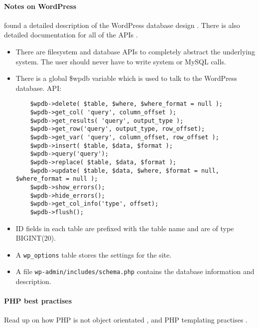 \paragraph{Notes on WordPress} found a detailed description of the
WordPress database design \cite{WordPressND}. There is also detailed
documentation for all of the APIs \cite{WordPressNDa}.
\begin{itemize}
\item There are filesystem and database APIs to completely abstract the
  underlying system. The user should never have to write system or MySQL calls.
\item There is a global \$wpdb variable which is used to talk to the WordPress
  database. API:
\begin{verbatim}
    $wpdb->delete( $table, $where, $where_format = null );
    $wpdb->get_col( 'query', column_offset );
    $wpdb->get_results( 'query', output_type );
    $wpdb->get_row('query', output_type, row_offset);
    $wpdb->get_var( 'query', column_offset, row_offset );
    $wpdb->insert( $table, $data, $format );
    $wpdb->query('query');
    $wpdb->replace( $table, $data, $format );
    $wpdb->update( $table, $data, $where, $format = null, $where_format = null );
    $wpdb->show_errors();
    $wpdb->hide_errors();
    $wpdb->get_col_info('type', offset);
    $wpdb->flush();
\end{verbatim}
\item ID fields in each table are prefixed with the table name and are of type
  BIGINT(20).
\item A \texttt{wp\_options} table stores the settings for the site.
\item A file \texttt{wp-admin/includes/schema.php} contains the database
  information and description.
\end{itemize}

\paragraph{PHP best practises} Read up on how PHP is not object orientated
\cite{Kimsal2011}, and PHP templating practises \cite{Rakowski2011}.
